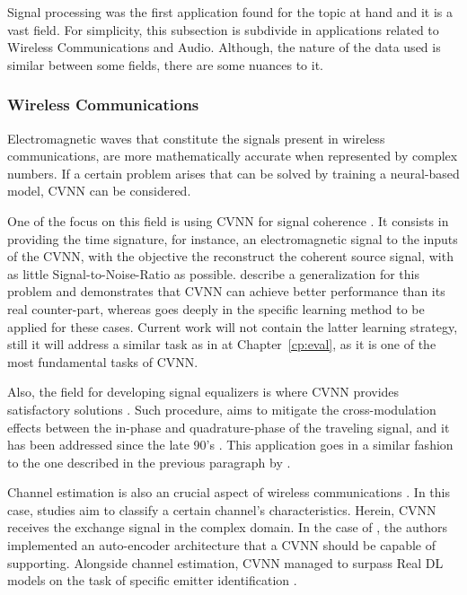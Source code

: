 Signal processing was the first application found for the topic at hand \parencite{hirose2012complex} and it is a vast field. For simplicity, this subsection is subdivide in applications related to Wireless Communications and Audio. Although, the nature of the data used is similar between some fields, there are some nuances to it.

\subsubsection{Wireless Communications}
Electromagnetic waves that constitute the signals present in wireless communications, are more mathematically accurate when represented by complex numbers. If a certain problem arises that can be solved by training a neural-based model, \gls{CVNN} can be considered. 

One of the focus on this field is using \gls{CVNN} for signal coherence \parencite{hirose2012cohersignal, wu2017singalcohercvnn}. It consists in providing the time signature, for instance, an electromagnetic signal to the inputs of the \gls{CVNN}, with the objective the reconstruct the coherent source signal, with as little Signal-to-Noise-Ratio as possible. \textcite{hirose2012cohersignal} describe a generalization for this problem and demonstrates that \gls{CVNN} can achieve better performance than its real counter-part, whereas \textcite{wu2017singalcohercvnn} goes deeply in the specific learning method to be applied for these cases. Current work will not contain the latter learning strategy, still it will address a similar task as in \textcite{hirose2012cohersignal}  at Chapter~\ref{cp:eval}, as it is one of the most fundamental tasks of CVNN.

Also, the field for developing signal equalizers is where \gls{CVNN} provides satisfactory solutions \parencite{uncini1999equalizerold, cheolwoo1998oldeuqalizer, hong2014equalizerhammer, liu2017equalizercvnn}. Such procedure, aims to mitigate the cross-modulation effects between the in-phase and quadrature-phase of the traveling signal, and it has been addressed since the late 90's \parencite{uncini1999equalizerold, cheolwoo1998oldeuqalizer}. This application goes in a similar fashion to the one described in the previous paragraph by \textcite{liu2017equalizercvnn}. 

Channel estimation is also an crucial aspect of wireless communications \parencite{murata2015cvnnforsignalchapter, yuan2019channel}. In this case, studies aim to classify a certain channel's characteristics. Herein, \gls{CVNN} receives the exchange signal in the complex domain. In the case of \parencite{yuan2019channel}, the authors implemented an auto-encoder architecture that a CVNN should be capable of supporting. Alongside channel estimation, \gls{CVNN} managed to surpass Real \gls{DL} models on the task of specific emitter identification \parencite{wang2021emmiteridcvnn}.

